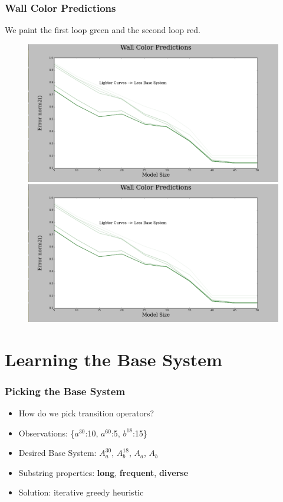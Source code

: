 \documentclass{beamer}
\begin{document}
\begin{frame}
\frametitle{Wall Color Predictions}
We paint the first loop green and the second loop red.
\begin{figure}
\includegraphics[width=0.5\linewidth]{lucasplots/monImages/WallColorPredictions.png}
\includegraphics[width=0.5\linewidth]{lucasplots/monImages/WallColorPredictions.png}


\end{figure}
\end{frame}



\section{Learning the Base System}

\begin{frame}
\frametitle{Picking the Base System}
\begin{itemize}


\item How do we pick transition operators?
\item[] Observations: \{$a^{30}$:10, $a^{60}$:5, $b^{18}$:15\}

\item[] Desired Base System: {$A_a^{30}$, $A_b^{18}$, $A_a$, $A_b$}

\item Substring properties: 
\textbf{long}, \textbf{frequent}, \textbf{diverse}

\item Solution: iterative greedy heuristic 


\end{itemize}
\end{frame}
\end{document}
